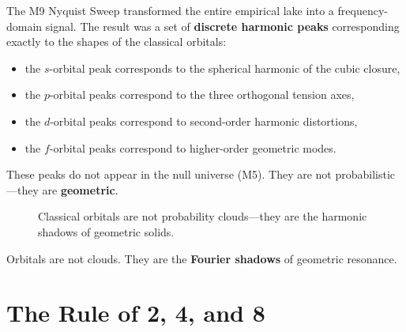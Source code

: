 \documentclass[11pt, letterpaper, openany]{book}
\begin{document}
The M9 Nyquist Sweep transformed the entire empirical lake into a frequency-domain
signal. The result was a set of \textbf{discrete harmonic peaks} corresponding exactly to the
shapes of the classical orbitals:

\begin{itemize}
    \item the $s$-orbital peak corresponds to the spherical harmonic of the cubic closure,
    \item the $p$-orbital peaks correspond to the three orthogonal tension axes,
    \item the $d$-orbital peaks correspond to second-order harmonic distortions,
    \item the $f$-orbital peaks correspond to higher-order geometric modes.
\end{itemize}

These peaks do not appear in the null universe (M5). They are not probabilistic—they are
\textbf{geometric}.

\begin{figure}[H]
\centering
{}
\caption{Classical orbitals are not probability clouds—they are the harmonic shadows of
geometric solids.}
\end{figure}

\begin{tcolorbox}[colback=black!5,colframe=black,title=Empirical Result]
Orbitals are not clouds.  
They are the \textbf{Fourier shadows} of geometric resonance.
\end{tcolorbox}

\section{The Rule of 2, 4, and 8}
\end{document}
